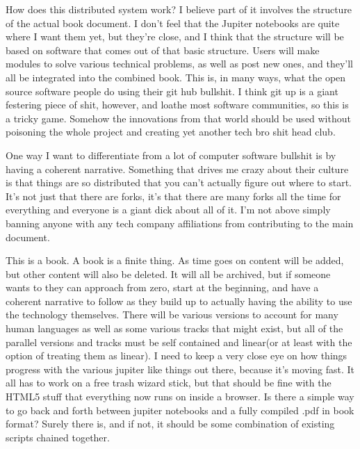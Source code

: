 How does this distributed system work? I believe part of it involves the
structure of the actual book document. I don't feel that the Jupiter
notebooks are quite where I want them yet, but they're close, and I
think that the structure will be based on software that comes out of
that basic structure. Users will make modules to solve various technical
problems, as well as post new ones, and they'll all be integrated into
the combined book. This is, in many ways, what the open source software
people do using their git hub bullshit. I think git up is a giant
festering piece of shit, however, and loathe most software communities,
so this is a tricky game. Somehow the innovations from that world should
be used without poisoning the whole project and creating yet another
tech bro shit head club.

One way I want to differentiate from a lot of computer software bullshit
is by having a coherent narrative. Something that drives me crazy about
their culture is that things are so distributed that you can't actually
figure out where to start. It's not just that there are forks, it's that
there are many forks all the time for everything and everyone is a giant
dick about all of it. I'm not above simply banning anyone with any tech
company affiliations from contributing to the main document.

This is a book. A book is a finite thing. As time goes on content will
be added, but other content will also be deleted. It will all be
archived, but if someone wants to they can approach from zero, start at
the beginning, and have a coherent narrative to follow as they build up
to actually having the ability to use the technology themselves. There
will be various versions to account for many human languages as well as
some various tracks that might exist, but all of the parallel versions
and tracks must be self contained and linear(or at least with the option
of treating them as linear). I need to keep a very close eye on how
things progress with the various jupiter like things out there, because
it's moving fast. It all has to work on a free trash wizard stick, but
that should be fine with the HTML5 stuff that everything now runs on
inside a browser. Is there a simple way to go back and forth between
jupiter notebooks and a fully compiled .pdf in book format? Surely there
is, and if not, it should be some combination of existing scripts
chained together.

